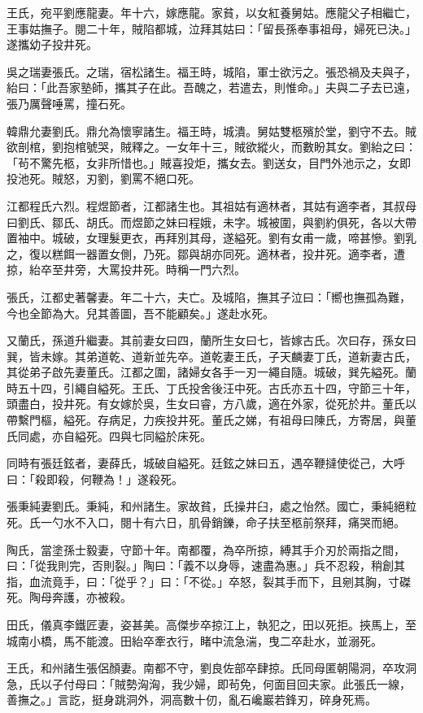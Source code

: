 \begin{pinyinscope}
王氏，宛平劉應龍妻。年十六，嫁應龍。家貧，以女紅養舅姑。應龍父子相繼亡，王事姑撫子。閱二十年，賊陷都城，泣拜其姑曰：「留長孫奉事祖母，婦死已決。」遂攜幼子投井死。

吳之瑞妻張氏。之瑞，宿松諸生。福王時，城陷，軍士欲污之。張恐禍及夫與子，紿曰：「此吾家塾師，攜其子在此。吾醜之，若遣去，則惟命。」夫與二子去已遠，張乃厲聲唾罵，撞石死。

韓鼎允妻劉氏。鼎允為懷寧諸生。福王時，城潰。舅姑雙柩殯於堂，劉守不去。賊欲剖棺，劉抱棺號哭，賊釋之。一女年十三，賊欲縱火，而數盼其女。劉紿之曰：「茍不驚先柩，女非所惜也。」賊喜投炬，攜女去。劉送女，目門外池示之，女即投池死。賊怒，刃劉，劉罵不絕口死。

江都程氏六烈。程煜節者，江都諸生也。其祖姑有適林者，其姑有適李者，其叔母曰劉氏、鄒氏、胡氏。而煜節之妹曰程娥，未字。城被圍，與劉約俱死，各以大帶置袖中。城破，女理髮更衣，再拜別其母，遂縊死。劉有女甫一歲，啼甚慘。劉乳之，復以糕餌一器置女側，乃死。鄒與胡亦同死。適林者，投井死。適李者，遭掠，紿卒至井旁，大罵投井死。時稱一門六烈。

張氏，江都史著馨妻。年二十六，夫亡。及城陷，撫其子泣曰：「嚮也撫孤為難，今也全節為大。兒其善圖，吾不能顧矣。」遂赴水死。

又蘭氏，孫道升繼妻。其前妻女曰四，蘭所生女曰七，皆嫁古氏。次曰存，孫女曰巽，皆未嫁。其弟道乾、道新並先卒。道乾妻王氏，子天麟妻丁氏，道新妻古氏，其從弟子啟先妻董氏。江都之圍，諸婦女各手一刃一繩自隨。城破，巽先縊死。蘭時五十四，引繩自縊死。王氏、丁氏投舍後汪中死。古氏亦五十四，守節三十年，頭盡白，投井死。有女嫁於吳，生女曰睿，方八歲，適在外家，從死於井。董氏以帶繫門樞，縊死。存病足，力疾投井死。董氏之娣，有祖母曰陳氏，方寄居，與董氏同處，亦自縊死。四與七同縊於床死。

同時有張廷鉉者，妻薛氏，城破自縊死。廷鉉之妹曰五，遇卒鞭撻使從己，大呼曰：「殺即殺，何鞭為！」遂殺死。

張秉純妻劉氏。秉純，和州諸生。家故貧，氏操井臼，處之怡然。國亡，秉純絕粒死。氏一勺水不入口，閱十有六日，肌骨銷鑠，命子扶至柩前祭拜，痛哭而絕。

陶氏，當塗孫士毅妻，守節十年。南都覆，為卒所掠，縛其手介刃於兩指之間，曰：「從我則完，否則裂。」陶曰：「義不以身辱，速盡為惠。」兵不忍殺，稍創其指，血流竟手，曰：「從乎？」曰：「不從。」卒怒，裂其手而下，且剜其胸，寸磔死。陶母奔護，亦被殺。

田氏，儀真李鐵匠妻，姿甚美。高傑步卒掠江上，執犯之，田以死拒。挾馬上，至城南小橋，馬不能渡。田紿卒牽衣行，睹中流急湍，曳二卒赴水，並溺死。

王氏，和州諸生張侶顏妻。南都不守，劉良佐部卒肆掠。氏同母匿朝陽洞，卒攻洞急，氏以子付母曰：「賊勢洶洶，我少婦，即茍免，何面目回夫家。此張氏一線，善撫之。」言訖，挺身跳洞外，洞高數十仞，亂石巉巖若鋒刃，碎身死焉。


\end{pinyinscope}
